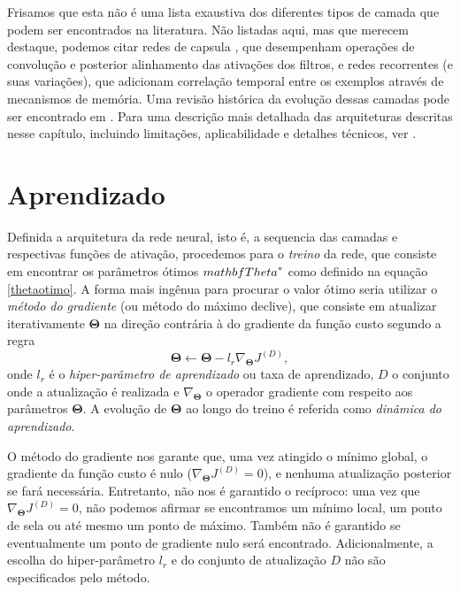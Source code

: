 Frisamos que esta não é uma lista exaustiva dos diferentes tipos de camada que podem ser encontrados na literatura. Não listadas aqui, mas que merecem destaque, podemos citar redes de capsula \cite{sabour2017dynamic}, que desempenham operações de convolução e posterior alinhamento das ativações dos filtros, e redes recorrentes (e suas variações), que adicionam correlação temporal entre os exemplos através de mecanismos de memória. Uma revisão histórica da evolução dessas camadas pode ser encontrado em \cite{jurgenReview2015}. Para uma descrição mais detalhada das arquiteturas descritas nesse capítulo, incluindo limitações, aplicabilidade e detalhes técnicos, ver \cite{Goodfellow-et-al-2016}.

\section{Aprendizado}\label{sec:aprendizado}

Definida a arquitetura da rede neural, isto é, a sequencia das camadas e respectivas funções de ativação, procedemos para o \textit{treino} da rede, que consiste em encontrar os parâmetros ótimos $\\mathbf{Theta}^*$ como definido na equação \ref{thetaotimo}. A forma mais ingênua para procurar o valor ótimo seria utilizar o \textit{método do gradiente} (ou método do máximo declive), que consiste em atualizar iterativamente $\mathbf{\Theta}$ na direção contrária à do gradiente da função custo segundo a regra 
\begin{equation}
\mathbf{\Theta} \leftarrow \mathbf{\Theta} - l_r \nabla_{\mathbf{\Theta}} J^{(D)},
\end{equation}
onde $l_r$ é o \textit{hiper-parâmetro de aprendizado} ou taxa de aprendizado, $D$ o conjunto onde a atualização é realizada e $\nabla_{\mathbf{\Theta}}$ o operador gradiente com respeito aos parâmetros $\mathbf{\Theta}$. A evolução de $\mathbf{\Theta}$ ao longo do treino é referida como \textit{dinâmica do aprendizado}.

O método do gradiente nos garante que, uma vez atingido o mínimo global, o gradiente da função custo é nulo ($\nabla_{\mathbf{\Theta}} J^{(D)} = 0$), e nenhuma atualização posterior se fará necessária. Entretanto, não nos é garantido o recíproco: uma vez que $\nabla_{\mathbf{\Theta}} J^{(D)} = 0$, não podemos afirmar se encontramos um mínimo local, um ponto de sela ou até mesmo um ponto de máximo. Também não é garantido se eventualmente um ponto de gradiente nulo será encontrado. Adicionalmente, a escolha do hiper-parâmetro $l_r$ e do conjunto de atualização $D$ não são especificados pelo método.


